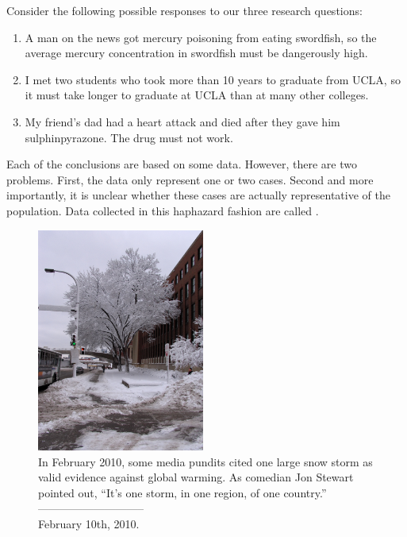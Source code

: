 Consider the following possible responses to our three research questions:
\begin{enumerate}
\item A man on the news got mercury poisoning from eating swordfish, so the average mercury concentration in swordfish must be dangerously high.
\item\label{iKnowThreeStudentsWhoTookMoreThan10YearsToGraduateAtUCLA} I met two students who took more than 10 years to graduate from UCLA, so it must take longer to graduate at UCLA than at many other colleges.
\item\label{myFriendsDadDiedAfterSulphinpyrazon} My friend's dad had a heart attack and died after they gave him sulphinpyrazone. The drug must not work.
\end{enumerate}
Each of the conclusions are based on some data. However, there are two problems. First, the data only represent one or two cases. Second and more importantly, it is unclear whether these cases are actually representative of the population. Data collected in this haphazard fashion are called .
\setlength{\captionwidth}{\textwidth-64mm}
\begin{figure}
\begin{centering}
\includegraphics[width=55mm]{01/figures/mnWinter/mnWinter}\hspace{4mm}
\begin{minipage}[b]{\textwidth - 64mm}
   \caption[anecdotal evidence]{In February 2010, some media pundits cited one large snow storm as valid evidence against global warming. As comedian Jon Stewart pointed out, ``It's one storm, in one region, of one country.''\vspace{-4.5mm} \\
   
   -----------------------------\vspace{-2mm}\\
   {\footnotesize February 10th, 2010.}
   \label{mnWinter}}
\end{minipage}
\end{centering}
\end{figure}
\setlength{\captionwidth}{\mycaptionwidth}

